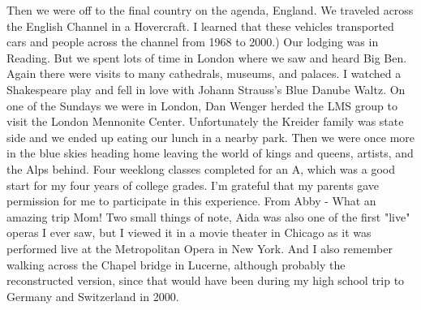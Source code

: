 Then we were off to the final country on the agenda, England. We traveled across the English Channel in a Hovercraft. I learned that these vehicles transported cars and people across the channel from 1968 to 2000.) Our lodging was in Reading. But we spent lots of time in London where we saw and heard Big Ben. Again there were visits to many cathedrals, museums, and palaces.  I watched a Shakespeare play and fell in love with Johann Strauss's Blue Danube Waltz.
On one of the Sundays we were in London, Dan Wenger herded the LMS group to visit the London Mennonite Center. Unfortunately the Kreider family was state side and we ended up eating our lunch in a nearby park. Then we were once more in the blue skies heading home leaving the world of kings and queens, artists, and the Alps behind. Four weeklong classes completed for an A, which was a good start for my four years of college grades. 
I'm grateful that my parents gave permission for me to participate in this experience.
From Abby - What an amazing trip Mom! Two small things of note, Aida was also one of the first "live" operas I ever saw, but I viewed it in a movie theater in Chicago as it was performed live at the Metropolitan Opera in New York. And I also remember walking across the Chapel bridge in Lucerne, although probably the reconstructed version, since that would have been during my high school trip to Germany and Switzerland in 2000.




